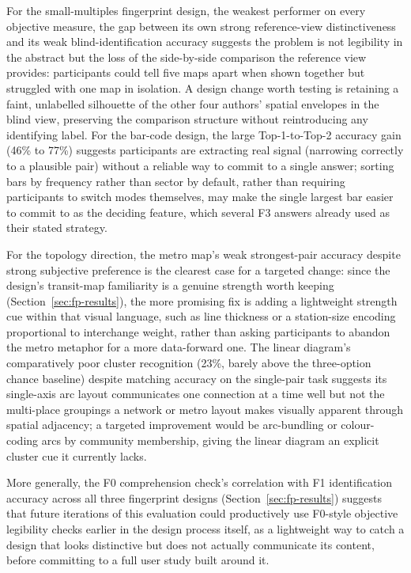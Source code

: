 \documentclass[logo,msc]{infthesis}
\begin{document}
For the small-multiples fingerprint design, the weakest performer on every objective measure, the gap between its own strong reference-view distinctiveness and its weak blind-identification accuracy suggests the problem is not legibility in the abstract but the loss of the side-by-side comparison the reference view provides: participants could tell five maps apart when shown together but struggled with one map in isolation. A design change worth testing is retaining a faint, unlabelled silhouette of the other four authors' spatial envelopes in the blind view, preserving the comparison structure without reintroducing any identifying label. For the bar-code design, the large Top-1-to-Top-2 accuracy gain (46\% to 77\%) suggests participants are extracting real signal (narrowing correctly to a plausible pair) without a reliable way to commit to a single answer; sorting bars by frequency rather than sector by default, rather than requiring participants to switch modes themselves, may make the single largest bar easier to commit to as the deciding feature, which several F3 answers already used as their stated strategy.

For the topology direction, the metro map's weak strongest-pair accuracy despite strong subjective preference is the clearest case for a targeted change: since the design's transit-map familiarity is a genuine strength worth keeping (Section~\ref{sec:fp-results}), the more promising fix is adding a lightweight strength cue within that visual language, such as line thickness or a station-size encoding proportional to interchange weight, rather than asking participants to abandon the metro metaphor for a more data-forward one. The linear diagram's comparatively poor cluster recognition (23\%, barely above the three-option chance baseline) despite matching accuracy on the single-pair task suggests its single-axis arc layout communicates one connection at a time well but not the multi-place groupings a network or metro layout makes visually apparent through spatial adjacency; a targeted improvement would be arc-bundling or colour-coding arcs by community membership, giving the linear diagram an explicit cluster cue it currently lacks.

More generally, the F0 comprehension check's correlation with F1 identification accuracy across all three fingerprint designs (Section~\ref{sec:fp-results}) suggests that future iterations of this evaluation could productively use F0-style objective legibility checks earlier in the design process itself, as a lightweight way to catch a design that looks distinctive but does not actually communicate its content, before committing to a full user study built around it.
 
\end{document}
